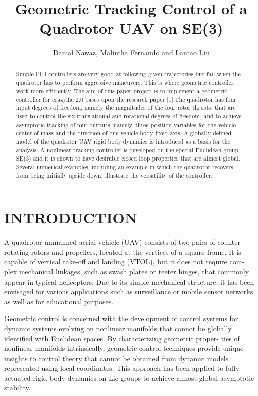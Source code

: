 \documentclass[letterpaper, 10 pt, conference]{ieeeconf}  %
\title{\LARGE \bf
Geometric Tracking Control of a Quadrotor UAV on SE(3)
}
\author{Danial Nawaz, Malintha Fernando and Lantao Liu}
\begin{document}
\maketitle
\thispagestyle{empty}
\pagestyle{empty}


\begin{abstract}

Simple PID controllers are very good at following given trajectories but fail when the quadrotor has to perform aggressive maneuvers. This is where geometric controller work more efficiently. The aim of this paper project is to implement a geometric controller for crazylfie 2.0 bases upon the research paper [1].The quadrotor has four input degrees of freedom, namely the magnitudes
of the four rotor thrusts, that are used to control the six
translational and rotational degrees of freedom, and to achieve
asymptotic tracking of four outputs, namely, three position
variables for the vehicle center of mass and the direction of
one vehicle body-fixed axis. A globally defined model of the
quadrotor UAV rigid body dynamics is introduced as a basis
for the analysis. A nonlinear tracking controller is developed
on the special Euclidean group SE(3) and it is shown to
have desirable closed loop properties that are almost global.
Several numerical examples, including an example in which the
quadrotor recovers from being initially upside down, illustrate
the versatility of the controller.
\end{abstract}


\section{INTRODUCTION}
A quadrotor unmanned aerial vehicle (UAV) consists of
two pairs of counter-rotating rotors and propellers, located
at the vertices of a square frame. It is capable of vertical
take-off and landing (VTOL), but it does not require com-
plex mechanical linkages, such as swash plates or teeter
hinges, that commonly appear in typical helicopters. Due
to its simple mechanical structure, it has been envisaged for
various applications such as surveillance or mobile sensor
networks as well as for educational purposes.

Geometric control is concerned with the development of
control systems for dynamic systems evolving on nonlinear
manifolds that cannot be globally identified with Euclidean
spaces. By characterizing geometric proper-
ties of nonlinear manifolds intrinsically, geometric control
techniques provide unique insights to control theory that
cannot be obtained from dynamic models represented using
local coordinates. This approach has been applied to
fully actuated rigid body dynamics on Lie groups to achieve
almost global asymptotic stability.
\end{document}
